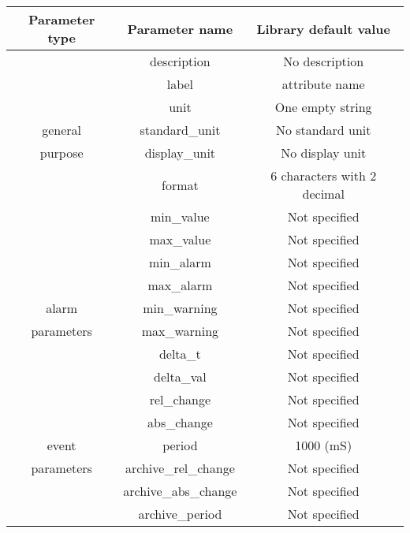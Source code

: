 \vspace{0.3cm}


\begin{center}
\begin{longtable}{|c|c|c|}
\hline 
Parameter type & Parameter name & Library default value\tabularnewline
\hline 
\hline 
 & description & \textquotedbl{}No description\textquotedbl{}\tabularnewline
\cline{2-3} 
\multicolumn{1}{|c|}{} & label & attribute name\tabularnewline
\cline{2-3} 
\multicolumn{1}{|c|}{} & unit & One empty string\tabularnewline
\cline{2-3} 
\multicolumn{1}{|c|}{general} & standard\_unit & \textquotedbl{}No standard unit\textquotedbl{}\tabularnewline
\cline{2-3} 
\multicolumn{1}{|c|}{purpose} & display\_unit & \textquotedbl{}No display unit\textquotedbl{}\tabularnewline
\cline{2-3} 
\multicolumn{1}{|c|}{} & format & 6 characters with 2 decimal\tabularnewline
\cline{2-3} 
\multicolumn{1}{|c|}{} & min\_value & \textquotedbl{}Not specified\textquotedbl{}\tabularnewline
\cline{2-3} 
\multicolumn{1}{|c|}{} & max\_value & \textquotedbl{}Not specified\textquotedbl{}\tabularnewline
\hline 
\multicolumn{1}{|c|}{} & min\_alarm & \textquotedbl{}Not specified\textquotedbl{}\tabularnewline
\cline{2-3} 
\multicolumn{1}{|c|}{} & max\_alarm & \textquotedbl{}Not specified\textquotedbl{}\tabularnewline
\cline{2-3} 
\multicolumn{1}{|c|}{alarm } & min\_warning & \textquotedbl{}Not specified\textquotedbl{}\tabularnewline
\cline{2-3} 
\multicolumn{1}{|c|}{parameters} & max\_warning & \textquotedbl{}Not specified\textquotedbl{}\tabularnewline
\cline{2-3} 
\multicolumn{1}{|c|}{} & delta\_t & \textquotedbl{}Not specified\textquotedbl{}\tabularnewline
\cline{2-3} 
\multicolumn{1}{|c|}{} & delta\_val & \textquotedbl{}Not specified\textquotedbl{}\tabularnewline
\hline 
\multicolumn{1}{|c|}{} & rel\_change & \textquotedbl{}Not specified\textquotedbl{}\tabularnewline
\cline{2-3} 
\multicolumn{1}{|c|}{} & abs\_change & \textquotedbl{}Not specified\textquotedbl{}\tabularnewline
\cline{2-3} 
\multicolumn{1}{|c|}{event} & period & 1000 (mS)\tabularnewline
\cline{2-3} 
\multicolumn{1}{|c|}{parameters} & archive\_rel\_change & \textquotedbl{}Not specified\textquotedbl{}\tabularnewline
\cline{2-3} 
\multicolumn{1}{|c|}{} & archive\_abs\_change & \textquotedbl{}Not specified\textquotedbl{}\tabularnewline
\cline{2-3} 
\multicolumn{1}{|c|}{} & archive\_period & \textquotedbl{}Not specified\textquotedbl{}\tabularnewline
\hline 
\end{longtable}
\par\end{center}

